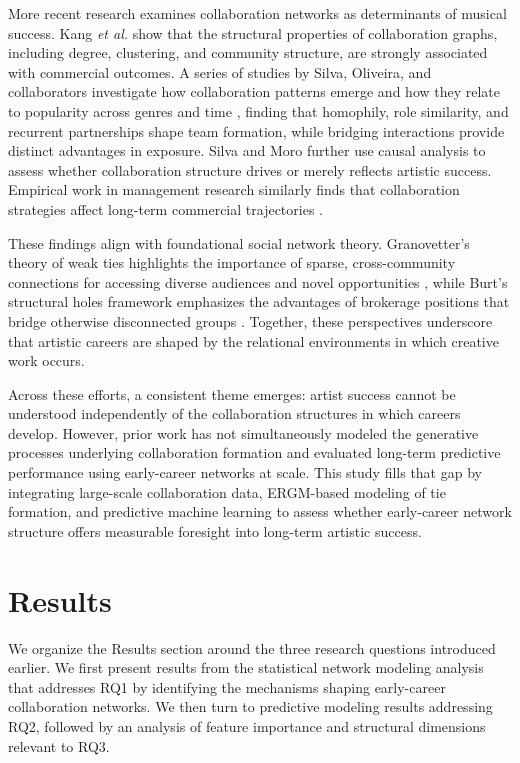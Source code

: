 \documentclass[fleqn,10pt]{wlscirep}
\begin{document}
More recent research examines collaboration networks as determinants of musical success. Kang \emph{et al.} \cite{Kang2022Musicians} show that the structural properties of collaboration graphs, including degree, clustering, and community structure, are strongly associated with commercial outcomes. A series of studies by Silva, Oliveira, and collaborators investigate how collaboration patterns emerge and how they relate to popularity across genres and time \cite{Silva2019SAC,Oliveira2020ISMIR,Oliveira2021Thesis}, finding that homophily, role similarity, and recurrent partnerships shape team formation, while bridging interactions provide distinct advantages in exposure. Silva and Moro \cite{Silva2019WebMedia} further use causal analysis to assess whether collaboration structure drives or merely reflects artistic success. Empirical work in management research similarly finds that collaboration strategies affect long-term commercial trajectories \cite{MartinezAlbeniz2023MusicIndustry}.

These findings align with foundational social network theory. Granovetter's theory of weak ties highlights the importance of sparse, cross-community connections for accessing diverse audiences and novel opportunities \cite{Granovetter1973WeakTies}, while Burt's structural holes framework emphasizes the advantages of brokerage positions that bridge otherwise disconnected groups \cite{Burt1992StructuralHoles}. Together, these perspectives underscore that artistic careers are shaped by the relational environments in which creative work occurs.

Across these efforts, a consistent theme emerges: artist success cannot be understood independently of the collaboration structures in which careers develop. However, prior work has not simultaneously modeled the generative processes underlying collaboration formation and evaluated long-term predictive performance using early-career networks at scale. This study fills that gap by integrating large-scale collaboration data, ERGM-based modeling of tie formation, and predictive machine learning to assess whether early-career network structure offers measurable foresight into long-term artistic success.

\section*{Results}

We organize the Results section around the three research questions introduced earlier. We first present results from the statistical network modeling analysis that addresses RQ1 by identifying the mechanisms shaping early-career collaboration networks. We then turn to predictive modeling results addressing RQ2, followed by an analysis of feature importance and structural dimensions relevant to RQ3.
\end{document}
